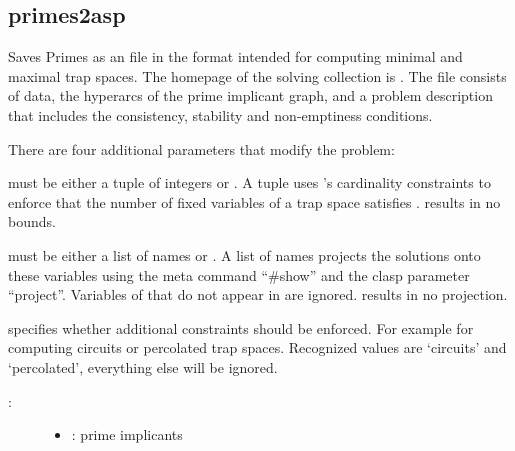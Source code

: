 \documentclass[letterpaper,10pt,english]{sphinxmanual}
\begin{document}
\subsection{primes2asp}
\label{\detokenize{AspSolver:primes2asp}}\label{\detokenize{AspSolver:id8}}

\begin{fulllineitems}
\label{\detokenize{AspSolver:PyBoolNet.AspSolver.primes2asp}}
Saves Primes as an  file in the  format intended for computing minimal and maximal trap spaces.
The homepage of the  solving collection is .
The  file consists of data, the hyperarcs of the prime implicant graph,
and a problem description that includes the consistency, stability and non-emptiness conditions.

There are four additional parameters that modify the problem:

 must be either a tuple of integers  or .
A tuple  uses ’s cardinality constraints to enforce that the number of fixed variables  of a trap space satisfies .
 results in no bounds.

 must be either a list of names or .
A list of names projects the solutions onto these variables using the meta command “\#show” and the clasp parameter “\textendash{}project”.
Variables of  that do not appear in  are ignored.
 results in no projection.

 specifies whether additional constraints should be enforced.
For example for computing circuits or percolated trap spaces.
Recognized values are ‘circuits’ and ‘percolated’, everything else will be ignored.
\begin{description}
\item[{:}] \leavevmode\begin{itemize}
\item {} 
: prime implicants


\end{itemize}
\end{description}
\end{fulllineitems}
\end{document}
